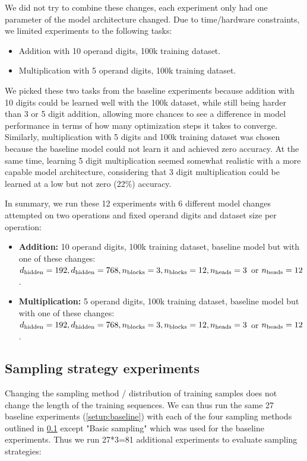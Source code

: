 We did not try to combine these changes, each experiment only had one parameter of the model architecture changed.
Due to time/hardware constraints, we limited experiments to the following tasks:

\begin{itemize}
	\item Addition with 10 operand digits, 100k training dataset.
	\item Multiplication with 5 operand digits, 100k training dataset.
\end{itemize}

We picked these two tasks from the baseline experiments because addition with 10 digits could be learned well with the 100k dataset, while still being harder than 3 or 5 digit addition, allowing more chances to see a difference in model performance in terms of how many optimization steps it takes to converge.
Similarly, multiplication with 5 digits and 100k training dataset was chosen because the baseline model could not learn it and achieved zero accuracy. At the same time, learning 5 digit multiplication seemed somewhat realistic with a more capable model architecture, considering that 3 digit multiplication could be learned at a low but not zero (22\%) accuracy.

In summary, we run these 12 experiments with 6 different model changes attempted on two operations and fixed operand digits and dataset size per operation:

\begin{itemize}
	\item \textbf{Addition:} 10 operand digits, 100k training dataset, baseline model but with one of these changes: ${d_\textrm{hidden}}=192, {d_\textrm{hidden}}=768, {n_\textrm{blocks}}=3, {n_\textrm{blocks}}=12, {n_\textrm{heads}}=3$ or ${n_\textrm{heads}}=12$.
	\item \textbf{Multiplication:} 5 operand digits, 100k training dataset, baseline model but with one of these changes: ${d_\textrm{hidden}}=192, {d_\textrm{hidden}}=768, {n_\textrm{blocks}}=3, {n_\textrm{blocks}}=12, {n_\textrm{heads}}=3$ or ${n_\textrm{heads}}=12$.
\end{itemize}


\subsection{Sampling strategy experiments}
\label{setup:sampling}

Changing the sampling method / distribution of training samples does not change the length of the training sequences. We can thus run the same 27 baseline experiments (\cref{setup:baseline}) with each of the four sampling methods outlined in \cref{setup:sampling} except "Basic sampling" which was used for the baseline experiments. Thus we run 27*3=81 additional experiments to evaluate sampling strategies:

